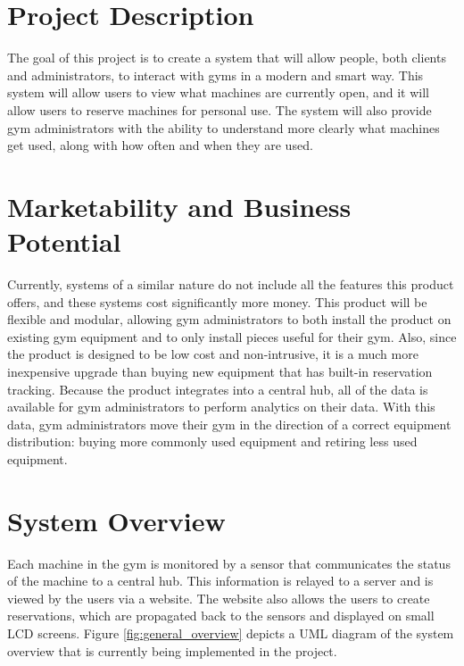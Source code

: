 \documentclass[letterpaper,11pt]{./templates/texMemo} %
\begin{document}
\maketitle 

\section{Project Description}
The goal of this project is to create a system that will allow people, both clients and administrators, to interact with gyms in a modern and smart way. This system will allow users to view what machines are currently open, and it will allow users to reserve machines for personal use. The system will also provide gym administrators with the ability to understand more clearly what machines get used, along with how often and when they are used.

\section{Marketability and Business Potential}
Currently, systems of a similar nature do not include all the features this product offers, and these systems cost significantly more money. This product will be flexible and modular, allowing gym administrators to both install the product on existing gym equipment and to only install pieces useful for their gym. Also, since the product is designed to be low cost and non-intrusive, it is a much more inexpensive upgrade than buying new equipment that has built-in reservation tracking. Because the product integrates into a central hub, all of the data is available for gym administrators to perform analytics on their data. With this data, gym administrators move their gym in the direction of a correct equipment distribution: buying more commonly used equipment and retiring less used equipment.

\section{System Overview}
Each machine in the gym is monitored by a sensor that communicates the status of the machine to a central hub. This information is relayed to a server and is viewed by the users via a website. The website also allows the users to create reservations, which are propagated back to the sensors and displayed on small LCD screens. Figure \ref{fig:general_overview} depicts a UML diagram of the system overview that is currently being implemented in the project.
\end{document}
